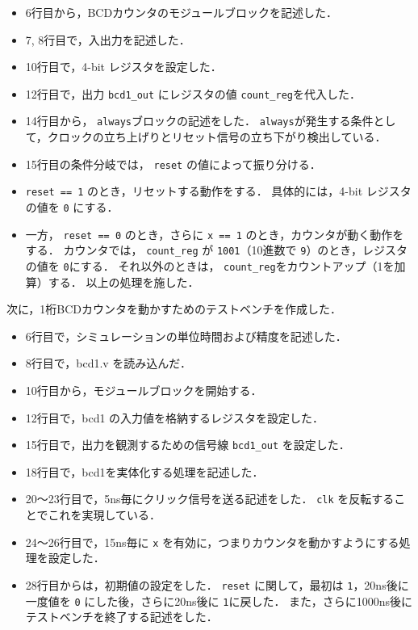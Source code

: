 \documentclass[uplatex]{jsarticle}
\begin{document}
\begin{itemize}
  \item 6行目から，BCDカウンタのモジュールブロックを記述した．
  \item 7, 8行目で，入出力を記述した．
  \item 10行目で，4-bit レジスタを設定した．
  \item 12行目で，出力 {\tt bcd1\_out} にレジスタの値 {\tt count\_reg}を代入した．
  \item 
    14行目から， {\tt always}ブロックの記述をした．
    {\tt always}が発生する条件として，クロックの立ち上げりとリセット信号の立ち下がり検出している．
  \item 
    15行目の条件分岐では， {\tt reset} の値によって振り分ける．
  \item
    {\tt reset == 1} のとき，リセットする動作をする．
    具体的には，4-bit レジスタの値を {\tt 0} にする．
  \item
    一方， {\tt reset == 0} のとき，さらに {\tt x == 1} のとき，カウンタが動く動作をする．
    カウンタでは， {\tt count\_reg} が {\tt 1001}（10進数で {\tt 9}）のとき，レジスタの値を {\tt 0}にする．
    それ以外のときは， {\tt count\_reg}をカウントアップ（1を加算）する．
    以上の処理を施した．
\end{itemize}

次に，1桁BCDカウンタを動かすためのテストベンチを作成した．

\begin{itemize}
  \item 6行目で，シミュレーションの単位時間および精度を記述した．
  \item 8行目で，bcd1.v を読み込んだ．
  \item 10行目から，モジュールブロックを開始する．
  \item 12行目で，bcd1 の入力値を格納するレジスタを設定した．
  \item 15行目で，出力を観測するための信号線 {\tt bcd1\_out} を設定した．
  \item 18行目で，bcd1を実体化する処理を記述した．
  \item 20〜23行目で，5ns毎にクリック信号を送る記述をした． {\tt clk} を反転することでこれを実現している．
  \item 24〜26行目で，15ns毎に {\tt x} を有効に，つまりカウンタを動かすようにする処理を設定した．
  \item 
    28行目からは，初期値の設定をした．
    {\tt reset} に関して，最初は {\tt 1}，20ns後に一度値を {\tt 0} にした後，さらに20ns後に {\tt 1}に戻した．
    また，さらに1000ns後にテストベンチを終了する記述をした．  
\end{itemize}
\end{document}
